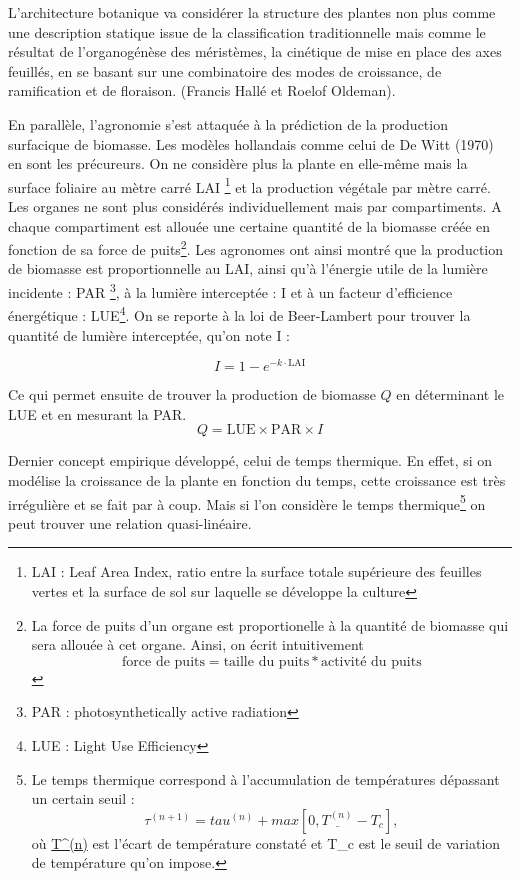 L’architecture botanique va considérer la structure des plantes non plus comme une description statique issue de la classification traditionnelle mais comme le résultat de l’organogénèse des méristèmes, la cinétique de mise en place des axes feuillés, en se basant sur une combinatoire des modes de croissance, de ramification et de floraison. (Francis Hallé et Roelof Oldeman).

En parallèle, l’agronomie s’est attaquée à la prédiction de la production surfacique de biomasse. Les modèles hollandais comme celui de De Witt (1970) en sont les précureurs. On ne considère plus la plante en elle-même mais la surface foliaire au mètre carré LAI \footnote{LAI : Leaf Area Index, ratio entre la surface totale supérieure des feuilles vertes et la surface de sol sur laquelle se développe la culture} et la production végétale par mètre carré. Les organes ne sont plus considérés individuellement mais par compartiments. A chaque compartiment est allouée une certaine quantité de la biomasse créée en fonction de sa force de 
puits\footnote{La force de puits d'un organe est proportionelle à la quantité de biomasse qui sera allouée à cet organe.\cite[~p.229--231]{hopkins2003physiologie} 
Ainsi, on écrit intuitivement 
\[
	\text{force de puits} = \text{taille du puits} * \text{activité du puits}
\]
}. 
Les agronomes ont ainsi montré que la production de biomasse est proportionnelle au LAI, ainsi qu'à l’énergie utile de la lumière incidente : PAR \footnote{PAR : photosynthetically active radiation }, à la lumière interceptée : I et à un facteur d’efficience énergétique : LUE\footnote{LUE : Light Use Efficiency}. On se reporte à la loi de Beer-Lambert pour trouver la quantité de lumière interceptée, qu'on note I : 

\[ I = 1-e^{-k\cdot\mathrm{LAI}} \]

Ce qui permet ensuite de trouver la production de biomasse $Q$
en déterminant le LUE et en mesurant la PAR.
\[ 
  Q = \mathrm{LUE}\times\mathrm{PAR}\times I 
\]

Dernier concept empirique développé, celui de temps thermique. En effet, si on modélise la croissance de la plante  en fonction du temps, cette croissance est très irrégulière et se fait par à coup. Mais si l’on considère le temps thermique\footnote{Le temps thermique correspond à l'accumulation de températures dépassant un certain seuil :
\[
\tau^{(n+1)} = tau^{(n)} + max[0, \underline{T^{(n)}} - T_c], 
\]
où \underline{T^{(n)}} est l'écart de température constaté et 
T_c est le seuil de variation de température qu'on impose.
} 
on peut trouver une relation quasi-linéaire.

